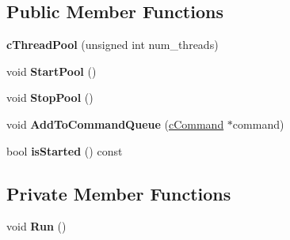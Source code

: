 \subsection*{\-Public \-Member \-Functions}
\begin{DoxyCompactItemize}
\item 
\hypertarget{classengine_1_1cThreadPool_a1cef23416a63c1a652d07b074a40b42e}{
{\bfseries c\-Thread\-Pool} (unsigned int num\-\_\-threads)}
\label{classengine_1_1cThreadPool_a1cef23416a63c1a652d07b074a40b42e}

\item 
\hypertarget{classengine_1_1cThreadPool_a97cf0269aebd226e59d973a89181d709}{
void {\bfseries \-Start\-Pool} ()}
\label{classengine_1_1cThreadPool_a97cf0269aebd226e59d973a89181d709}

\item 
\hypertarget{classengine_1_1cThreadPool_aeafab9fa5546e10b0deebff1e8df60d9}{
void {\bfseries \-Stop\-Pool} ()}
\label{classengine_1_1cThreadPool_aeafab9fa5546e10b0deebff1e8df60d9}

\item 
\hypertarget{classengine_1_1cThreadPool_a0c20020f1a69f4ea0abdb75d1adde225}{
void {\bfseries \-Add\-To\-Command\-Queue} (\hyperlink{classengine_1_1cCommand}{c\-Command} $\ast$command)}
\label{classengine_1_1cThreadPool_a0c20020f1a69f4ea0abdb75d1adde225}

\item 
\hypertarget{classengine_1_1cThreadPool_a207b8bcf506d3cd151f0fc815772111c}{
bool {\bfseries is\-Started} () const }
\label{classengine_1_1cThreadPool_a207b8bcf506d3cd151f0fc815772111c}

\end{DoxyCompactItemize}
\subsection*{\-Private \-Member \-Functions}
\begin{DoxyCompactItemize}
\item 
\hypertarget{classengine_1_1cThreadPool_af573f11026d6b6079c56af7e50df5ca6}{
void {\bfseries \-Run} ()}
\label{classengine_1_1cThreadPool_af573f11026d6b6079c56af7e50df5ca6}

\end{DoxyCompactItemize}

